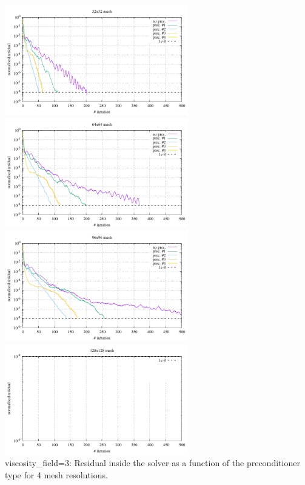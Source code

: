 \begin{center} 
\includegraphics[width=8cm]{python_codes/fieldstone_16/results/visc_field_3/residual_32x32.pdf}
\includegraphics[width=8cm]{python_codes/fieldstone_16/results/visc_field_3/residual_64x64.pdf}\\
\includegraphics[width=8cm]{python_codes/fieldstone_16/results/visc_field_3/residual_96x96.pdf}
\includegraphics[width=8cm]{python_codes/fieldstone_16/results/visc_field_3/residual_128x128.pdf}\\
{\captionfont viscosity\_field=3: Residual inside the solver as a function of the preconditioner type for
4 mesh resolutions.}
\end{center}

